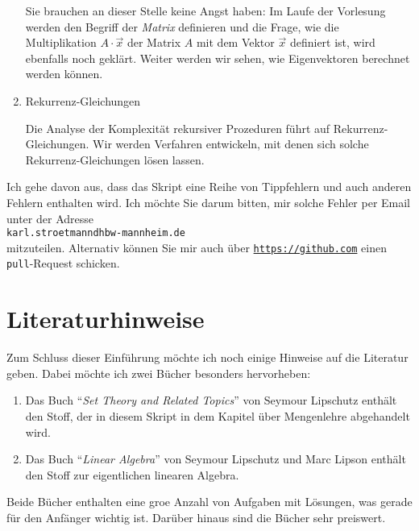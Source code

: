 \begin{enumerate}
      Sie brauchen an dieser Stelle keine Angst haben: Im Laufe der Vorlesung werden den Begriff der
      \emph{Matrix} definieren  und die Frage, wie die Multiplikation $A \cdot \vec{x}$ der Matrix $A$ mit
      dem Vektor $\vec{x}$ definiert ist, wird ebenfalls noch gekl\"{a}rt.  Weiter werden wir sehen,
      wie Eigenvektoren berechnet werden k\"{o}nnen.
\item Rekurrenz-Gleichungen

      Die Analyse der Komplexit\"{a}t rekursiver Prozeduren f\"{u}hrt auf Rekurrenz-Gleichungen.
      Wir werden Verfahren entwickeln, mit denen sich solche Rekurrenz-Gleichungen l\"{o}sen lassen.
\end{enumerate}
\remark
Ich gehe davon aus,  dass das  Skript eine Reihe von Tippfehlern und auch anderen Fehlern enthalten
wird.  Ich m\"{o}chte Sie darum bitten, mir solche Fehler per Email unter der Adresse
\\[0.2cm]
\hspace*{1.3cm}
\texttt{karl.stroetmanndhbw-mannheim.de}
\\[0.2cm]
mitzuteilen.  Alternativ k\"{o}nnen Sie mir auch \"{u}ber
\href{https://github.com}{\texttt{https://github.com}} einen \texttt{pull}-Request schicken.

\section{Literaturhinweise}
Zum Schluss dieser Einf\"{u}hrung m\"{o}chte ich noch einige Hinweise auf die Literatur geben.  Dabei m\"{o}chte
ich zwei B\"{u}cher besonders hervorheben:
\begin{enumerate}
\item Das Buch ``\emph{Set Theory and Related Topics}'' von Seymour Lipschutz \cite{lipschutz:1998} enth\"{a}lt den Stoff, der
      in diesem Skript in dem Kapitel \"{u}ber Mengenlehre abgehandelt wird.
\item Das Buch ``\emph{Linear Algebra}'' von Seymour Lipschutz und Marc Lipson \cite{lipschutz:2012}
      enth\"{a}lt den Stoff zur eigentlichen linearen Algebra.
\end{enumerate}
Beide B\"{u}cher enthalten eine gro\3e Anzahl von Aufgaben mit L\"{o}sungen, was gerade f\"{u}r den Anf\"{a}nger
wichtig ist.  Dar\"{u}ber hinaus sind die B\"{u}cher
sehr preiswert.  

